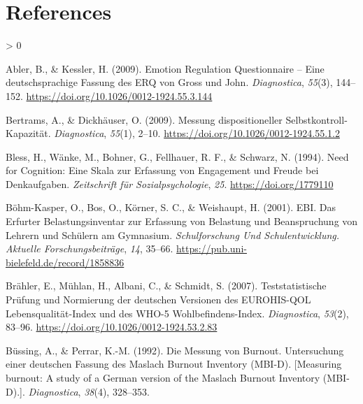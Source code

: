 \documentclass[
  english,
  man]{apa6}
\newlength{\cslhangindent}
\newenvironment{CSLReferences}[2] %
 {%
  \setlength{\parindent}{0pt}
  \ifodd #1 \everypar{\setlength{\hangindent}{\cslhangindent}}\ignorespaces\fi
  \ifnum #2 > 0
  \setlength{\parskip}{#2\baselineskip}
  \fi
 }%
 {}
\begin{document}
\newpage

\hypertarget{references}{%
\section{References}\label{references}}

\begingroup
\setlength{\parindent}{-0.5in}
\setlength{\leftskip}{0.5in}

\hypertarget{refs}{}
\begin{CSLReferences}{1}{0}
\leavevmode\hypertarget{ref-Abler2009}{}%
Abler, B., \& Kessler, H. (2009). Emotion {Regulation} {Questionnaire} -- {Eine} deutschsprachige {Fassung} des {ERQ} von {Gross} und {John}. \emph{Diagnostica}, \emph{55}(3), 144--152. \url{https://doi.org/10.1026/0012-1924.55.3.144}

\leavevmode\hypertarget{ref-Bertrams2009a}{}%
Bertrams, A., \& Dickhäuser, O. (2009). Messung dispositioneller {Selbstkontroll}-{Kapazität}. \emph{Diagnostica}, \emph{55}(1), 2--10. \url{https://doi.org/10.1026/0012-1924.55.1.2}

\leavevmode\hypertarget{ref-Bless1994}{}%
Bless, H., Wänke, M., Bohner, G., Fellhauer, R. F., \& Schwarz, N. (1994). Need for {Cognition}: {Eine} {Skala} zur {Erfassung} von {Engagement} und {Freude} bei {Denkaufgaben}. \emph{Zeitschrift für Sozialpsychologie}, \emph{25}. \url{https://doi.org/1779110}

\leavevmode\hypertarget{ref-BoehmKasper2001}{}%
Böhm-Kasper, O., Bos, O., Körner, S. C., \& Weishaupt, H. (2001). {EBI}. {Das} {Erfurter} {Belastungsinventar} zur {Erfassung} von {Belastung} und {Beanspruchung} von {Lehrern} und {Schülern} am {Gymnasium}. \emph{Schulforschung Und Schulentwicklung. Aktuelle Forschungsbeiträge}, \emph{14}, 35--66. \url{https://pub.uni-bielefeld.de/record/1858836}

\leavevmode\hypertarget{ref-Braehler2007}{}%
Brähler, E., Mühlan, H., Albani, C., \& Schmidt, S. (2007). Teststatistische {Prüfung} und {Normierung} der deutschen {Versionen} des {EUROHIS}-{QOL} {Lebensqualität}-{Index} und des {WHO}-5 {Wohlbefindens}-{Index}. \emph{Diagnostica}, \emph{53}(2), 83--96. \url{https://doi.org/10.1026/0012-1924.53.2.83}

\leavevmode\hypertarget{ref-Buessing1992}{}%
Büssing, A., \& Perrar, K.-M. (1992). Die {Messung} von {Burnout}. {Untersuchung} einer deutschen {Fassung} des {Maslach} {Burnout} {Inventory} ({MBI}-{D}). {[}{Measuring} burnout: {A} study of a {German} version of the {Maslach} {Burnout} {Inventory} ({MBI}-{D}).{]}. \emph{Diagnostica}, \emph{38}(4), 328--353.


\end{CSLReferences}
\end{document}
